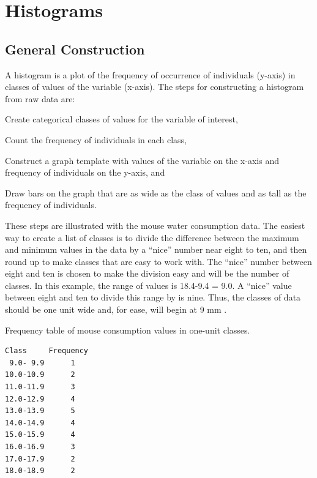 \documentclass[10pt,openany]{book}\usepackage[]{graphicx}\usepackage[]{color}
\begin{document}
\section{Histograms}
\vspace{-8pt}
\subsection{General Construction}
\vspace{-8pt}
A histogram is a plot of the frequency of occurrence of individuals (y-axis) in classes of values of the variable (x-axis).  The steps for constructing a histogram from raw data are:
\vspace{-6pt}
\begin{Enumerate}
  \item Create categorical classes of values for the variable of interest,
  \item Count the frequency of individuals in each class,
  \item Construct a graph template with values of the variable on the x-axis and frequency of individuals on the y-axis, and
  \item Draw bars on the graph that are as wide as the class of values and as tall as the frequency of individuals.
\end{Enumerate}

These steps are illustrated with the mouse water consumption data. The easiest way to create a list of classes is to divide the difference between the maximum and minimum values in the data by a ``nice'' number near eight to ten, and then round up to make classes that are easy to work with. The ``nice'' number between eight and ten is chosen to make the division easy and will be the number of classes.  In this example, the range of values is 18.4-9.4 = 9.0.  A ``nice'' value between eight and ten to divide this range by is nine.  Thus, the classes of data should be one unit wide and, for ease, will begin at 9 mm .

\begin{table}[htbp]
  \caption{Frequency table of mouse consumption values in one-unit classes.}
  \label{tab:MouseFreqTable}
    \begin{Verbatim}[xleftmargin=25mm]
Class     Frequency
 9.0- 9.9      1
10.0-10.9      2
11.0-11.9      3
12.0-12.9      4
13.0-13.9      5
14.0-14.9      4
15.0-15.9      4
16.0-16.9      3
17.0-17.9      2
18.0-18.9      2
    \end{Verbatim}
\end{table}
\end{document}
